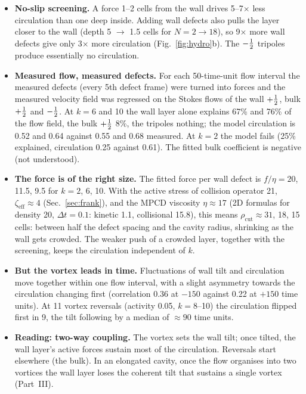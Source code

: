 \begin{itemize}
  \item \textbf{No-slip screening.} A force 1--2 cells from the wall drives 5--7$\times$ less circulation than one deep inside. Adding wall defects
        also pulls the layer closer to the wall (depth 5 $\to$ 1.5 cells for $N=2\to18$), so 9$\times$ more wall defects give only 3$\times$ more
        circulation (Fig.~\ref{fig:hydro}b). The $-\tfrac12$ tripoles produce essentially no circulation.
  \item \textbf{Measured flow, measured defects.} For each 50-time-unit flow interval the measured defects (every 5th defect frame) were turned into
        forces and the measured velocity field was regressed on the Stokes flows of the wall $+\tfrac12$, bulk $+\tfrac12$ and $-\tfrac12$. At $k=6$ and 10 the
        wall layer alone explains 67\% and 76\% of the flow field, the bulk $+\tfrac12$ 8\%, the tripoles nothing; the model circulation is 0.52 and 0.64
        against 0.55 and 0.68 measured. At $k=2$ the model fails (25\% explained, circulation 0.25 against 0.61). The fitted bulk coefficient is negative
        (not understood).
  \item \textbf{The force is of the right size.} The fitted force per wall defect is $f/\eta=20$, 11.5, 9.5 for $k=2$, 6, 10. With the active stress of
        collision operator 21, $\zeta_\mathrm{eff}\approx4$ (Sec.~\ref{sec:frank}), and the MPCD viscosity $\eta\approx17$ (2D formulas for density 20,
        $\Delta t=0.1$: kinetic 1.1, collisional 15.8), this means $\rho_\mathrm{cut}\approx31$, 18, 15 cells: between half the defect spacing and the cavity
        radius, shrinking as the wall gets crowded. The weaker push of a crowded layer, together with the screening, keeps the circulation independent of $k$.
  \item \textbf{But the vortex leads in time.} Fluctuations of wall tilt and circulation move together within one flow interval, with a slight asymmetry
        towards the circulation changing first (correlation 0.36 at $-150$ against 0.22 at $+150$ time units). At 11 vortex reversals (activity 0.05,
        $k=8$--10) the circulation flipped first in 9, the tilt following by a median of $\approx90$ time units.
  \item \textbf{Reading: two-way coupling.} The vortex sets the wall tilt; once tilted, the wall layer's active forces sustain most of the circulation.
        Reversals start elsewhere (the bulk). In an elongated cavity, once the flow organises into two vortices the wall layer loses the coherent tilt
        that sustains a single vortex (Part~III).
\end{itemize}
